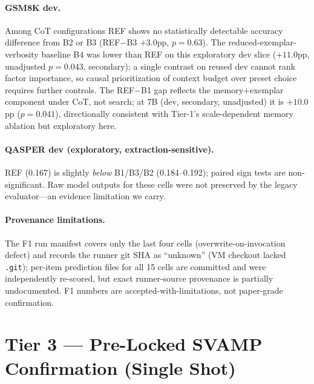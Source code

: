 \documentclass[11pt]{article}
\begin{document}
\paragraph{GSM8K dev.} Among CoT configurations REF shows no statistically
detectable accuracy difference from B2 or B3 (REF$-$B3 $+3.0$pp,
$p{=}0.63$). The reduced-exemplar-verbosity baseline B4 was lower than REF
on this exploratory dev slice ($+11.0$pp, unadjusted $p{=}0.043$,
secondary); a single contrast on reused dev cannot rank factor importance,
so causal prioritization of context budget over preset choice requires
further controls. The REF$-$B1 gap reflects the memory+exemplar component
under CoT, not search; at 7B (dev, secondary, unadjusted) it is $+10.0$pp
($p{=}0.041$), directionally consistent with Tier-1's scale-dependent
memory ablation but exploratory here.

\paragraph{QASPER dev (exploratory, extraction-sensitive).} REF (0.167) is
slightly \emph{below} B1/B3/B2 (0.184--0.192); paired sign tests are
non-significant. Raw model outputs for these cells were not preserved by
the legacy evaluator---an evidence limitation we carry.

\paragraph{Provenance limitations.} The F1 run manifest covers only the
last four cells (overwrite-on-invocation defect) and records the runner
git SHA as ``unknown'' (VM checkout lacked \texttt{.git}); per-item
prediction files for all 15 cells are committed and were independently
re-scored, but exact runner-source provenance is partially undocumented.
F1 numbers are accepted-with-limitations, not paper-grade confirmation.

\section{Tier 3 --- Pre-Locked SVAMP Confirmation (Single Shot)}
\label{sec:tier3}
\end{document}
